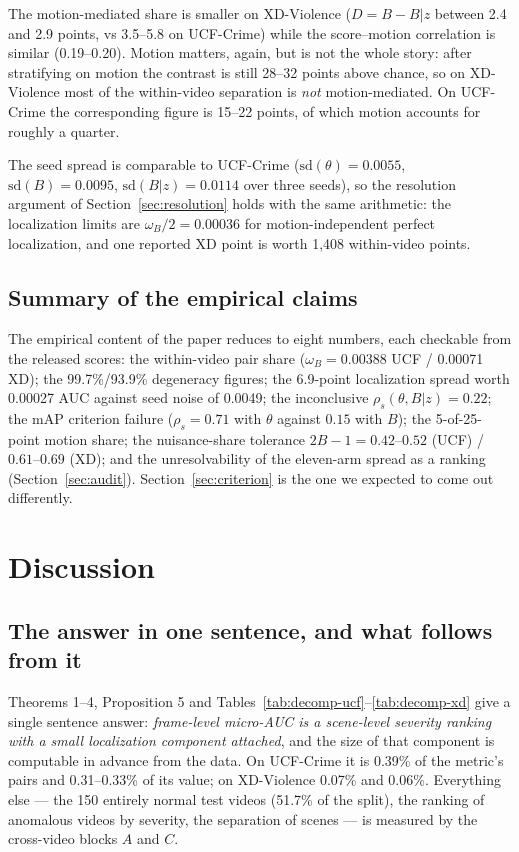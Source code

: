 \documentclass[number,preprint,12pt]{elsarticle}
\begin{document}
The motion-mediated share is smaller on XD-Violence (\(D = B - B|z\) between 2.4
and 2.9 points, vs 3.5--5.8 on UCF-Crime) while the score--motion correlation is
similar (0.19--0.20). Motion matters, again, but is not the whole story: after
stratifying on motion the contrast is still 28--32 points above chance, so on
XD-Violence most of the within-video separation is \emph{not} motion-mediated. On
UCF-Crime the corresponding figure is 15--22 points, of which motion accounts for
roughly a quarter.

The seed spread is comparable to UCF-Crime (\(\mathrm{sd}(\theta)=0.0055\),
\(\mathrm{sd}(B)=0.0095\), \(\mathrm{sd}(B|z)=0.0114\) over three seeds), so the resolution
argument of Section~\ref{sec:resolution} holds with the same arithmetic: the localization limits are
\(\omega_B/2=0.00036\) for motion-independent perfect localization, and one reported
XD point is worth 1,408 within-video points.

\subsection{Summary of the empirical claims}\label{sec:summary}

The empirical content of the paper reduces to eight numbers, each checkable
from the released scores: the within-video pair share (\(\omega_B=0.00388\) UCF /
0.00071 XD); the 99.7\%/93.9\% degeneracy figures; the 6.9-point localization
spread worth 0.00027 AUC against seed noise of 0.0049; the inconclusive
\(\rho_s(\theta,B|z)=0.22\); the mAP criterion failure (\(\rho_s=0.71\) with
\(\theta\) against \(0.15\) with \(B\)); the 5-of-25-point motion share; the
nuisance-share tolerance \(2B-1=0.42\)--\(0.52\) (UCF) / \(0.61\)--\(0.69\) (XD); and
the unresolvability of the eleven-arm spread as a ranking
(Section~\ref{sec:audit}). Section~\ref{sec:criterion} is the one we expected
to come out differently.

\section{Discussion}\label{sec:discussion}

\subsection{The answer in one sentence, and what follows from it}\label{sec:answer}

Theorems 1--4, Proposition 5 and Tables~\ref{tab:decomp-ucf}--\ref{tab:decomp-xd} give a single sentence answer: \emph{frame-level micro-AUC
is a scene-level severity ranking with a small localization component attached},
and the size of that component is computable in advance from the data. On
UCF-Crime it is 0.39\% of the metric's pairs and 0.31--0.33\% of its value; on
XD-Violence 0.07\% and 0.06\%. Everything else --- the 150 entirely normal test
videos (51.7\% of the split), the ranking of anomalous videos by severity, the separation
of scenes --- is measured by the cross-video blocks \(A\) and \(C\).
\end{document}
